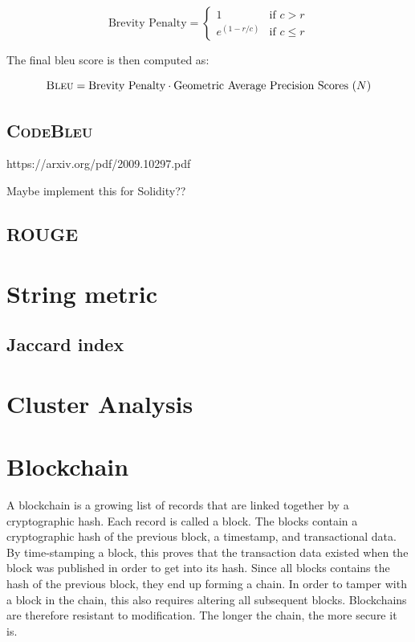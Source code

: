 \begin{equation}
    \label{eqn:brevity-penalty}
    \text{Brevity Penalty} = 
    \begin{cases}
        1 & \text{if } c > r\\
        e^{\left(1-r/c \right)} & \text{if } c \le r
    \end{cases}
\end{equation}

\noindent The final \acrshort{bleu} score is then computed as:

\begin{equation}
    \label{eqn:bleu}
    \textsc{Bleu} = \text{Brevity Penalty} \cdot \text{Geometric Average Precision Scores $\left(N\right)$}
\end{equation}



\subsection{\textsc{CodeBleu}}
\label{sec:code-bleu}
https://arxiv.org/pdf/2009.10297.pdf

Maybe implement this for Solidity??


\subsection{\textsc{ROUGE}}
\label{sec:rouge-score}

\section{String metric}
\label{sec:string-metric}

\subsection{Jaccard index}
\label{sec:jaccard-index}


\section{Cluster Analysis}
\label{sec:cluster-analysis}


\section{Blockchain}
\label{sec:blockchain}
A blockchain is a growing list of records that are linked together by a cryptographic hash. Each record is called a block. The blocks contain a cryptographic hash of the previous block, a timestamp, and transactional data. By time-stamping a block, this proves that the transaction data existed when the block was published in order to get into its hash. Since all blocks contains the hash of the previous block, they end up forming a chain. In order to tamper with a block in the chain, this also requires altering all subsequent blocks. Blockchains are therefore resistant to modification. The longer the chain, the more secure it is.

